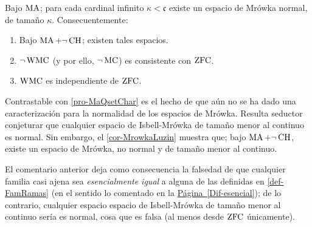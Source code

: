         \begin{corolario}\label{cor-PdmIndependiente}
            Bajo $\operatorname{MA}$; para cada cardinal infinito $\kappa<\mathfrak{c}$ existe un espacio de Mrówka normal, de tamaño $\kappa$. Consecuentemente:
            \begin{enumerate}
                \item Bajo $\operatorname{MA}+\lnot \operatorname{CH}$; existen tales espacios.
                \item $\lnot\operatorname{WMC}$ (y por ello, $\lnot\operatorname{MC}$) es consistente con $\operatorname{ZFC}$.
                \item $\operatorname{WMC}$ es independiente de $\operatorname{ZFC}$.
            \end{enumerate}
        \end{corolario}

        Contrastable con \ref{pro-MaQsetChar} es el hecho de que aún no se ha dado una caracterización para la normalidad de los espacios de Mrówka. Resulta seductor conjeturar que cualquier espacio de Isbell-Mrówka de tamaño menor al continuo es normal. Sin embargo, el \autoref{cor-MrowkaLuzin} muestra que; bajo $\operatorname{MA}+\lnot \operatorname{CH}$, existe un espacio de Mrówka, no normal y de tamaño menor al continuo.

        El comentario anterior deja como consecuencia la falsedad de que cualquier familia casi ajena sea \textit{esencialmente igual} a alguna de las definidas en \ref{def-FamRamas} (en el sentido lo comentado en la \hyperref[Dif-esencial]{Página~\ref{Dif-esencial}}); de lo contrario, cualquier espacio espacio de Isbell-Mrówka de tamaño menor al continuo sería es normal, cosa que es falsa (al menos desde $\operatorname{ZFC}$ únicamente).

